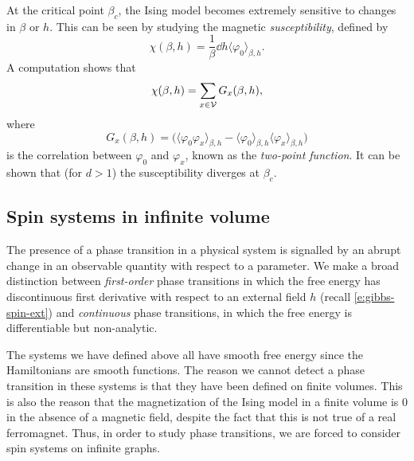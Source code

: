 At the critical point $\beta_c$, the Ising model becomes extremely
sensitive to changes in $\beta$ or $h$. This can be seen by studying the magnetic
\emph{susceptibility}, defined by
\begin{equation}
\chi(\beta, h)
	=
\frac{1}{\beta} \dd{}{h} \langle \varphi_0 \rangle_{\beta,h}.
\end{equation}
A computation shows that
\begin{equation}
\chi(\beta, h) = \sum_{x\in\mathcal{V}} G_x(\beta, h),
\end{equation}
where
\begin{equation}
G_x(\beta, h)
	=
\Big(
	\langle \varphi_0 \varphi_x \rangle_{\beta,h}
		-
	\langle \varphi_0 \rangle_{\beta,h} \langle \varphi_x \rangle_{\beta,h}
\Big)
\end{equation}
is the correlation between $\varphi_0$ and $\varphi_x$, known as the \emph{two-point function}.
It can be shown that (for $d > 1$) the susceptibility diverges at $\beta_c$.


\subsection{Spin systems in infinite volume}

The presence of a phase transition in a physical system is signalled by an
abrupt change in an observable quantity with respect to a parameter. We make a
broad distinction between \emph{first-order} phase transitions in which the
free energy has discontinuous first derivative with respect to an external
field $h$ (recall \eqref{e:gibbs-spin-ext}) and \emph{continuous} phase
transitions, in which the free energy is differentiable but non-analytic.

The systems we have defined above all
have smooth free energy since the Hamiltonians are smooth functions. The reason we cannot
detect a phase transition in these systems is that they have been defined on finite volumes.
This is also the reason that the magnetization of the Ising
model in a finite volume is $0$ in the absence of a magnetic field, despite the fact that
this is not true of a real ferromagnet. Thus, in order to study phase transitions, we are
forced to consider spin systems on infinite graphs.

